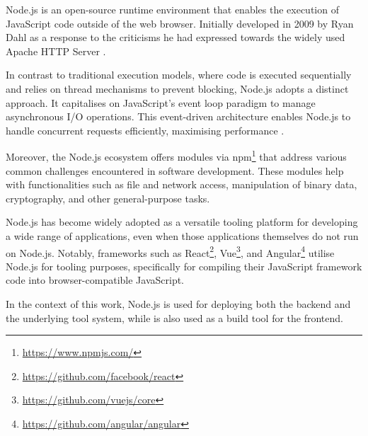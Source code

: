 Node.js is an open-source runtime environment that enables the execution of
JavaScript code outside of the web browser. Initially developed in 2009 by Ryan
Dahl as a response to the criticisms he had expressed towards the widely used
Apache HTTP Server .

In contrast to traditional execution models, where code is executed
sequentially and relies on thread mechanisms to prevent blocking, Node.js
adopts a distinct approach. It capitalises on JavaScript's event loop
 paradigm to manage asynchronous I/O operations.
This event-driven architecture enables Node.js to handle concurrent requests
efficiently, maximising performance .

Moreover, the Node.js ecosystem offers modules via
npm\footnote{\url{https://www.npmjs.com/}} that address various common
challenges encountered in software development. These modules help with
functionalities such as file and network access, manipulation of binary data,
cryptography, and other general-purpose tasks.

Node.js has become widely adopted as a versatile tooling platform for
developing a wide range of applications, even when those applications
themselves do not run on Node.js. Notably, frameworks such as
React\footnote{\url{https://github.com/facebook/react}},
Vue\footnote{\url{https://github.com/vuejs/core}}, and
Angular\footnote{\url{https://github.com/angular/angular}} utilise Node.js for
tooling purposes, specifically for compiling their JavaScript framework code
into browser-compatible JavaScript.

In the context of this work, Node.js is used for deploying both the backend and
the underlying tool system, while is also used as a build tool for the
frontend.
